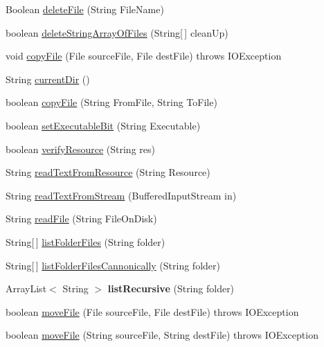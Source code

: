 \begin{DoxyCompactItemize}
Boolean \hyperlink{class_c_a_s_u_a_l_1_1_file_operations_a5b1172ca44af911f74d127cd05bf1f72}{delete\-File} (String File\-Name)
\item 
boolean \hyperlink{class_c_a_s_u_a_l_1_1_file_operations_a8e86ea11b79fef56147aba90dc3f4f0f}{delete\-String\-Array\-Of\-Files} (String\mbox{[}$\,$\mbox{]} clean\-Up)
\item 
void \hyperlink{class_c_a_s_u_a_l_1_1_file_operations_a95b6013a6610a12798b5a245a741196a}{copy\-File} (File source\-File, File dest\-File)  throws I\-O\-Exception 
\item 
String \hyperlink{class_c_a_s_u_a_l_1_1_file_operations_a6218a9a8ce1c18711d59b844417adc8a}{current\-Dir} ()
\item 
boolean \hyperlink{class_c_a_s_u_a_l_1_1_file_operations_a13967d313b6bd64f4449872f39cd9850}{copy\-File} (String From\-File, String To\-File)
\item 
boolean \hyperlink{class_c_a_s_u_a_l_1_1_file_operations_ad065441f27945626464c5ea2a5b1e453}{set\-Executable\-Bit} (String Executable)
\item 
boolean \hyperlink{class_c_a_s_u_a_l_1_1_file_operations_a24a24d669cba59590ae6dbb73b9b7bfa}{verify\-Resource} (String res)
\item 
String \hyperlink{class_c_a_s_u_a_l_1_1_file_operations_af56078757baad2c1f1ce56bbe88ed583}{read\-Text\-From\-Resource} (String Resource)
\item 
String \hyperlink{class_c_a_s_u_a_l_1_1_file_operations_a0f818b3dd5c29e59cd68073279769a99}{read\-Text\-From\-Stream} (Buffered\-Input\-Stream in)
\item 
String \hyperlink{class_c_a_s_u_a_l_1_1_file_operations_abb169d1cec0dd7a93538d2664aa30100}{read\-File} (String File\-On\-Disk)
\item 
String\mbox{[}$\,$\mbox{]} \hyperlink{class_c_a_s_u_a_l_1_1_file_operations_a61c260f82398c5fb5dae686cb03e8466}{list\-Folder\-Files} (String folder)
\item 
String\mbox{[}$\,$\mbox{]} \hyperlink{class_c_a_s_u_a_l_1_1_file_operations_a7e7c47afd356adc222f64c61d735e85b}{list\-Folder\-Files\-Cannonically} (String folder)
\item 
\hypertarget{class_c_a_s_u_a_l_1_1_file_operations_a0985307a047d8bfa4167afc3fede2aae}{Array\-List$<$ String $>$ {\bfseries list\-Recursive} (String folder)}\label{class_c_a_s_u_a_l_1_1_file_operations_a0985307a047d8bfa4167afc3fede2aae}

\item 
boolean \hyperlink{class_c_a_s_u_a_l_1_1_file_operations_aba0a4098903773ba1b9e5b1b926e2796}{move\-File} (File source\-File, File dest\-File)  throws I\-O\-Exception 
\item 
boolean \hyperlink{class_c_a_s_u_a_l_1_1_file_operations_a9c21e368697269b0c57b3534cefb6295}{move\-File} (String source\-File, String dest\-File)  throws I\-O\-Exception 
\end{DoxyCompactItemize}


